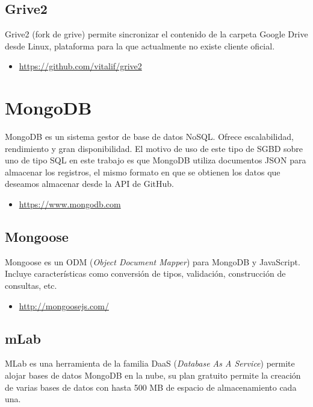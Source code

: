 \subsection{Grive2}

Grive2 (fork de grive) permite sincronizar el contenido de la carpeta Google Drive desde Linux, plataforma para la que actualmente no existe cliente oficial.

\begin{itemize}
	\item \url{https://github.com/vitalif/grive2}
\end{itemize}

\section{MongoDB}

MongoDB es un sistema gestor de base de datos NoSQL. Ofrece escalabilidad, rendimiento y gran disponibilidad. El motivo de uso de este tipo de SGBD sobre uno de tipo SQL en este trabajo es que MongoDB utiliza documentos JSON para almacenar los registros, el mismo formato en que se obtienen los datos que deseamos almacenar desde la API de GitHub.

\begin{itemize}
	\item \url{https://www.mongodb.com}
\end{itemize}

\subsection{Mongoose}

Mongoose es un ODM (\emph{Object Document Mapper}) para MongoDB y JavaScript. Incluye características como conversión de tipos, validación, construcción de consultas, etc.

\begin{itemize}
	\item \url{http://mongoosejs.com/}
\end{itemize}

\subsection{mLab}

MLab es una herramienta de la familia DaaS (\emph{Database As A Service}) permite alojar bases de datos MongoDB en la nube, su plan gratuito permite la creación de varias bases de datos con hasta 500 MB de espacio de almacenamiento cada una.

